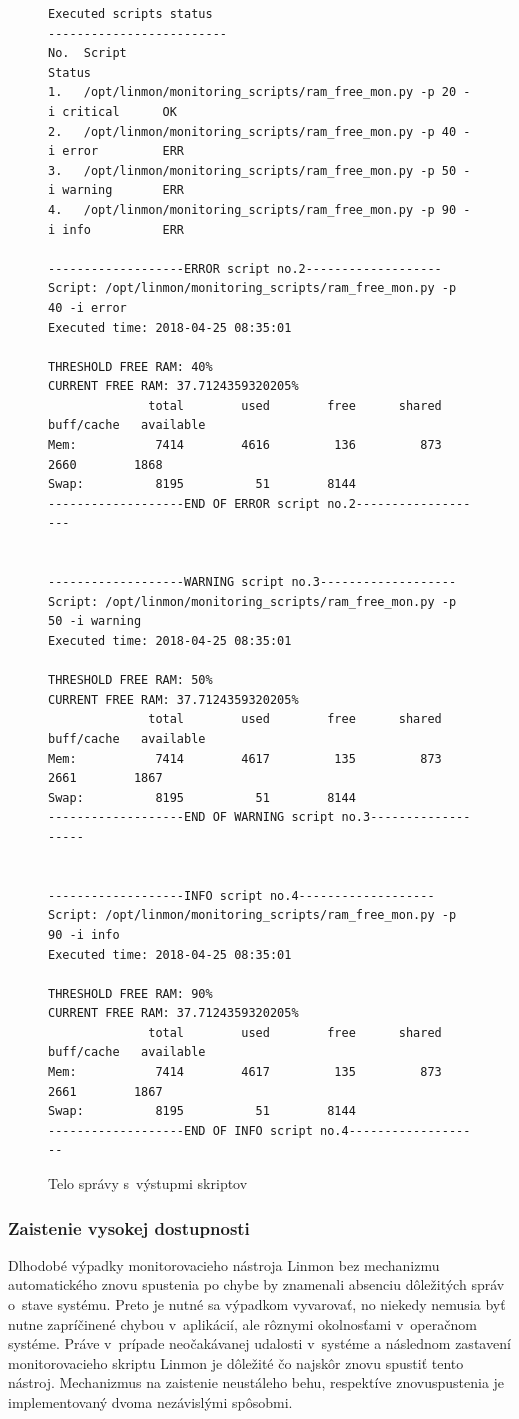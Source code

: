 \begin{figure}[H]
\centering
\footnotesize
\begin{BVerbatim}
Executed scripts status
-------------------------
No.  Script                                                                 Status
1.   /opt/linmon/monitoring_scripts/ram_free_mon.py -p 20 -i critical      OK
2.   /opt/linmon/monitoring_scripts/ram_free_mon.py -p 40 -i error         ERR
3.   /opt/linmon/monitoring_scripts/ram_free_mon.py -p 50 -i warning       ERR
4.   /opt/linmon/monitoring_scripts/ram_free_mon.py -p 90 -i info          ERR

-------------------ERROR script no.2-------------------
Script: /opt/linmon/monitoring_scripts/ram_free_mon.py -p 40 -i error
Executed time: 2018-04-25 08:35:01

THRESHOLD FREE RAM: 40%
CURRENT FREE RAM: 37.7124359320205%
              total        used        free      shared  buff/cache   available
Mem:           7414        4616         136         873        2660        1868
Swap:          8195          51        8144
-------------------END OF ERROR script no.2-------------------


-------------------WARNING script no.3-------------------
Script: /opt/linmon/monitoring_scripts/ram_free_mon.py -p 50 -i warning
Executed time: 2018-04-25 08:35:01

THRESHOLD FREE RAM: 50%
CURRENT FREE RAM: 37.7124359320205%
              total        used        free      shared  buff/cache   available
Mem:           7414        4617         135         873        2661        1867
Swap:          8195          51        8144
-------------------END OF WARNING script no.3-------------------


-------------------INFO script no.4-------------------
Script: /opt/linmon/monitoring_scripts/ram_free_mon.py -p 90 -i info
Executed time: 2018-04-25 08:35:01

THRESHOLD FREE RAM: 90%
CURRENT FREE RAM: 37.7124359320205%
              total        used        free      shared  buff/cache   available
Mem:           7414        4617         135         873        2661        1867
Swap:          8195          51        8144
-------------------END OF INFO script no.4------------------- 
\end{BVerbatim}
\caption{Telo správy s~výstupmi skriptov}
\label{notif_body}
\end{figure} 

\subsubsection*{Zaistenie vysokej dostupnosti}
\label{ha_impl}
Dlhodobé výpadky monitorovacieho nástroja Linmon bez mechanizmu automatického znovu spustenia po chybe by znamenali absenciu dôležitých správ o~stave systému. Preto je nutné sa výpadkom vyvarovať, no niekedy nemusia byť nutne zapríčinené chybou v~aplikácií, ale rôznymi okolnosťami v~operačnom systéme. Práve v~prípade neočakávanej udalosti v~systéme a následnom zastavení monitorovacieho skriptu Linmon je dôležité čo najskôr znovu spustiť tento nástroj. Mechanizmus na zaistenie neustáleho behu, respektíve znovuspustenia je implementovaný dvoma nezávislými spôsobmi.

